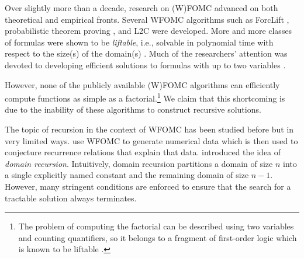 Over slightly more than a decade, research on (W)FOMC advanced on both theoretical and empirical fronts. Several WFOMC algorithms such as ForcLift \citep{DBLP:conf/ijcai/BroeckTMDR11}, probabilistic theorem proving \citep{DBLP:journals/cacm/GogateD16}, and L2C \citep{DBLP:conf/kr/KazemiP16} were developed. More and more classes of formulas were shown to be \emph{liftable}, i.e., solvable in polynomial time with respect to the size(s) of the domain(s) \citep{DBLP:conf/kr/BremenK21,DBLP:conf/nips/KazemiKBP16,DBLP:conf/lics/KuusistoL18,DBLP:journals/jair/Kuzelka21}. Much of the researchers' attention was devoted to developing efficient solutions to formulas with up to two variables \citep{DBLP:conf/uai/BremenK21,DBLP:journals/corr/abs-2110-05992}.


However, none of the publicly available (W)FOMC algorithms can efficiently compute functions as simple as a factorial.\footnote{The problem of computing the factorial can be described using two variables and counting quantifiers, so it belongs to a fragment of first-order logic which is known to be liftable \citep{DBLP:journals/jair/Kuzelka21}.} We claim that this shortcoming is due to the inability of these algorithms to construct recursive solutions.


The topic of recursion in the context of WFOMC has been studied before but in very limited ways.  use WFOMC to generate numerical data which is then used to conjecture recurrence relations that explain that data.  introduced the idea of \emph{domain recursion}. Intuitively, domain recursion partitions a domain of size $n$ into a single explicitly named constant and the remaining domain of size $n-1$. However, many stringent conditions are enforced to ensure that the search for a tractable solution always terminates.




